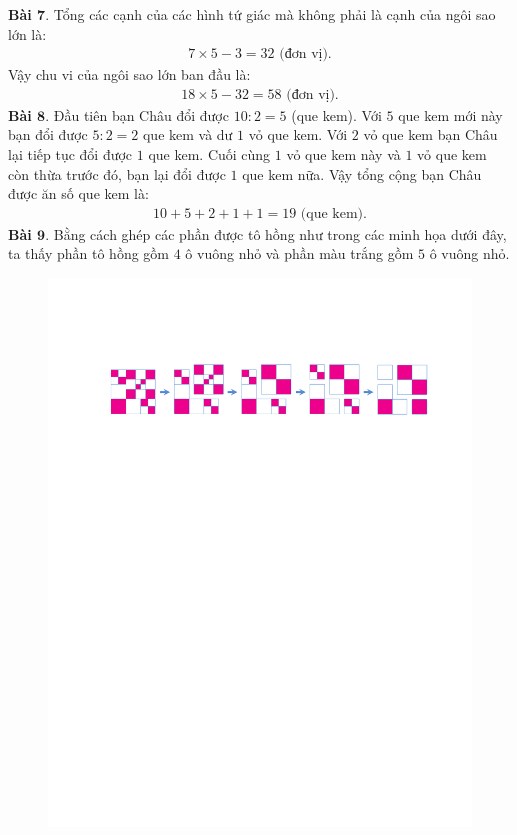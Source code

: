 \begin{multicols}{2}
\begin{figure}[H]
	\end{figure}
	\textbf{\color{toancuabi}Bài $\pmb{7.}$} Tổng các cạnh của các hình tứ giác mà không phải là cạnh của ngôi sao lớn là:
	\begin{align*}
		7\times 5-3 = 32 \text{ (đơn vị).}
	\end{align*}
	Vậy chu vi của ngôi sao lớn ban đầu là:
	\begin{align*}
		18\times 5-32 = 58 \text{ (đơn vị).}
	\end{align*}
	\textbf{\color{toancuabi}Bài $\pmb{8.}$}  Đầu tiên bạn Châu đổi được $10:2=5$ (que kem). Với $5$ que kem mới này bạn đổi được $5:2=2$ que kem và dư $1$ vỏ que kem. Với $2$ vỏ que kem bạn Châu lại tiếp tục đổi được $1$ que kem. Cuối cùng $1$ vỏ que kem này và $1$ vỏ que kem còn thừa trước đó, bạn lại đổi được $1$ que kem nữa. Vậy tổng cộng bạn Châu được ăn số que kem là: 
	\begin{align*}
		10+5+2+1+1=19 \text{ (que kem).}
	\end{align*}
	\textbf{\color{toancuabi}Bài $\pmb{9.}$} Bằng cách ghép các phần được tô hồng như trong các minh họa dưới đây, ta thấy phần tô hồng gồm $4$ ô vuông nhỏ và phần màu trắng gồm $5$ ô vuông nhỏ.
	\begin{figure}[H]
		\vspace*{-5pt}
		\centering
		\captionsetup{labelformat= empty, justification=centering}
		\includegraphics[width= 1\linewidth]{10a.pdf}

\end{figure}
\end{multicols}
